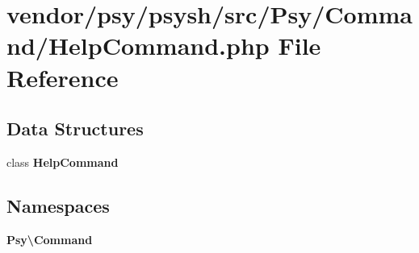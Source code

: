\section{vendor/psy/psysh/src/\+Psy/\+Command/\+Help\+Command.php File Reference}
\label{psy_2psysh_2src_2_psy_2_command_2_help_command_8php}
\subsection*{Data Structures}
\begin{DoxyCompactItemize}
\item 
class {\bf Help\+Command}
\end{DoxyCompactItemize}
\subsection*{Namespaces}
\begin{DoxyCompactItemize}
\item 
 {\bf Psy\textbackslash{}\+Command}
\end{DoxyCompactItemize}
